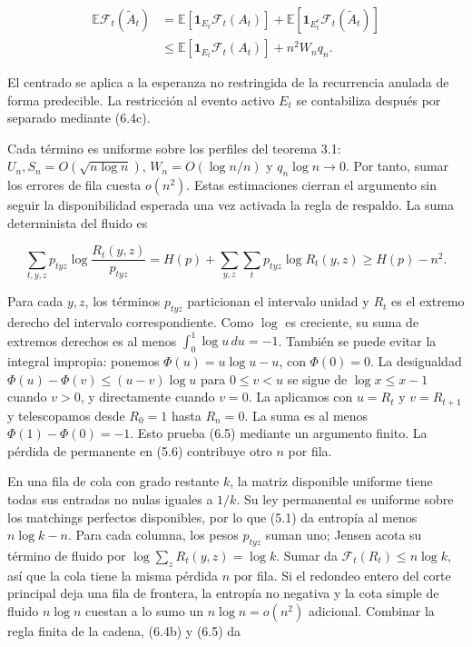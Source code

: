 \documentclass[spanish,11pt,a4paper]{article}
\begin{document}
\nopagebreak[4]
\[\begin{aligned}
\mathbb E\mathcal F_t(\widetilde A_t)
&=\mathbb E[\mathbf1_{E_t}\mathcal F_t(A_t)]
+\mathbb E[\mathbf1_{E_t^c}\mathcal F_t(\widetilde A_t)]\\
&\le\mathbb E[\mathbf1_{E_t}\mathcal F_t(A_t)]+n^2W_nq_n.
\end{aligned}\tag{6.4c}\]

El centrado se aplica a la esperanza no restringida de la recurrencia anulada de forma predecible. La restricción al evento activo \(E_t\) se contabiliza después por separado mediante (6.4c).

Cada término es uniforme sobre los perfiles del teorema 3.1: \(U_n,S_n=O(\sqrt{n\log n})\), \(W_n=O(\log n/n)\) y \(q_n\log n\to0\). Por tanto, sumar los errores de fila cuesta \(o(n^2)\). Estas estimaciones cierran el argumento sin seguir la disponibilidad esperada una vez activada la regla de respaldo. La suma determinista del fluido es

\nopagebreak[4]
\[\sum_{t,y,z}p_{tyz}\log\frac{R_t(y,z)}{p_{tyz}}
=H(p)+\sum_{y,z}\sum_t p_{tyz}\log R_t(y,z)\ge H(p)-n^2.\tag{6.5}\]

Para cada \(y,z\), los términos \(p_{tyz}\) particionan el intervalo unidad y \(R_t\) es el extremo derecho del intervalo correspondiente. Como \(\log\) es creciente, su suma de extremos derechos es al menos \(\int_0^1\log u\,du=-1\). También se puede evitar la integral impropia: ponemos \(\Phi(u)=u\log u-u\), con \(\Phi(0)=0\). La desigualdad \(\Phi(u)-\Phi(v)\le(u-v)\log u\) para \(0\le v<u\) se sigue de \(\log x\le x-1\) cuando \(v>0\), y directamente cuando \(v=0\). La aplicamos con \(u=R_t\) y \(v=R_{t+1}\) y telescopamos desde \(R_0=1\) hasta \(R_n=0\). La suma es al menos \(\Phi(1)-\Phi(0)=-1\). Esto prueba (6.5) mediante un argumento finito. La pérdida de permanente en (5.6) contribuye otro \(n\) por fila.

En una fila de cola con grado restante \(k\), la matriz disponible uniforme tiene todas sus entradas no nulas iguales a \(1/k\). Su ley permanental es uniforme sobre los matchings perfectos disponibles, por lo que (5.1) da entropía al menos \(n\log k-n\). Para cada columna, los pesos \(p_{tyz}\) suman uno; Jensen acota su término de fluido por \(\log\sum_zR_t(y,z)=\log k\). Sumar da \(\mathcal F_t(R_t)\le n\log k\), así que la cola tiene la misma pérdida \(n\) por fila. Si el redondeo entero del corte principal deja una fila de frontera, la entropía no negativa y la cota simple de fluido \(n\log n\) cuestan a lo sumo un \(n\log n=o(n^2)\) adicional. Combinar la regla finita de la cadena, (6.4b) y (6.5) da
\end{document}
